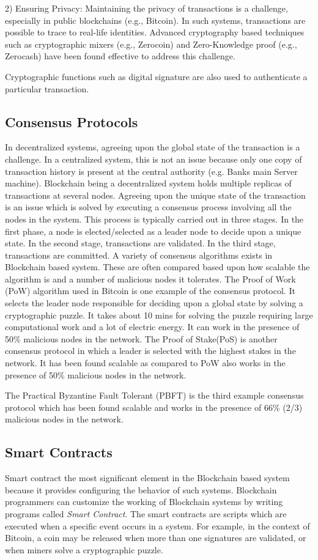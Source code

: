 \documentclass[10pt]{IETBook}
\begin{document}
2) Ensuring Privacy: Maintaining the privacy of transactions is a challenge, especially in public blockchains (e.g., Bitcoin). In such systems, transactions are possible to trace to real-life identities. Advanced cryptography based techniques such as cryptographic mixers (e.g., Zerocoin) and Zero-Knowledge proof (e.g., Zerocash) have been found effective to address this challenge.

Cryptographic functions such as digital signature are also used to authenticate a particular transaction.

\subsection{Consensus Protocols}
In decentralized systems, agreeing upon the global state of the transaction is a challenge. In a centralized system, this is not an issue because only one copy of transaction history is present at the central authority (e.g. Banks main Server machine). Blockchain being a decentralized system holds multiple replicas of transactions at several nodes. Agreeing upon the unique state of the transaction is an issue which is solved by executing a consensus process involving all the nodes in the system. This process is typically carried out in three stages. In the first phase, a node is elected/selected as a leader node to decide upon a unique state. In the second stage, transactions are validated. In the third stage, transactions are committed. A variety of consensus algorithms exists in Blockchain based system. These are often compared based upon how scalable the algorithm is and a number of malicious nodes it tolerates. The Proof of Work (PoW) algorithm used in Bitcoin is one example of the consensus protocol. It selects the leader node responsible for deciding upon a global state by solving a cryptographic puzzle. It takes about 10 mins for solving the puzzle requiring large computational work and a lot of electric energy. It can work in the presence of 50\% malicious nodes in the network.
The Proof of Stake(PoS) is another consensus protocol in which a leader is selected with the highest stakes in the network. It has been found scalable as compared to PoW also works in the presence of 50\% malicious nodes in the network.

The Practical Byzantine Fault Tolerant (PBFT) is the third example consensus protocol which has been found scalable and works in the presence of 66\% (2/3) malicious nodes in the network.

\subsection{Smart Contracts}
Smart contract the most significant element in the Blockchain based system because it provides configuring the behavior of such systems. Blockchain programmers can customize the working of Blockchain systems by writing programs called {\em Smart Contract}. The smart contracts are scripts which are executed when a specific event occurs in a system. For example, in the context of Bitcoin, a coin may be released when more than one signatures are validated, or when miners solve a cryptographic puzzle.
\end{document}
